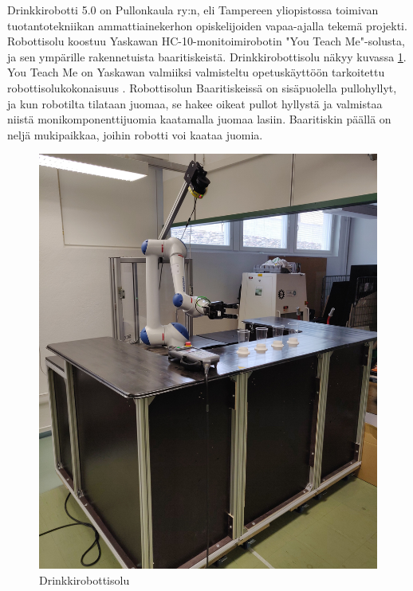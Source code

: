 Drinkkirobotti 5.0 on Pullonkaula ry:n, eli Tampereen yliopistossa toimivan tuotantotekniikan ammattiainekerhon opiskelijoiden vapaa-ajalla tekemä projekti. Robottisolu koostuu Yaskawan HC-10-monitoimirobotin "You Teach Me"\hyp{}solusta, ja sen ympärille rakennetuista baaritiskeistä. Drinkkirobottisolu näkyy kuvassa \ref{fig:drinkkirobotti}. You Teach Me on Yaskawan valmiiksi valmisteltu opetuskäyttöön tarkoitettu robottisolukokonaisuus \cite{Yaskawa2017}. Robottisolun  Baaritiskeissä on sisäpuolella pullohyllyt, ja kun robotilta tilataan juomaa, se hakee oikeat pullot hyllystä ja valmistaa niistä monikomponenttijuomia kaatamalla juomaa lasiin. Baaritiskin päällä on neljä mukipaikkaa, joihin robotti voi kaataa juomia.

\begin{figure}[h]
\begin{center}
\includegraphics[scale=0.08]{img/drinkkirobotti.jpg}   %
\end{center}
\caption{Drinkkirobottisolu}
\label{fig:drinkkirobotti}
\end{figure}

